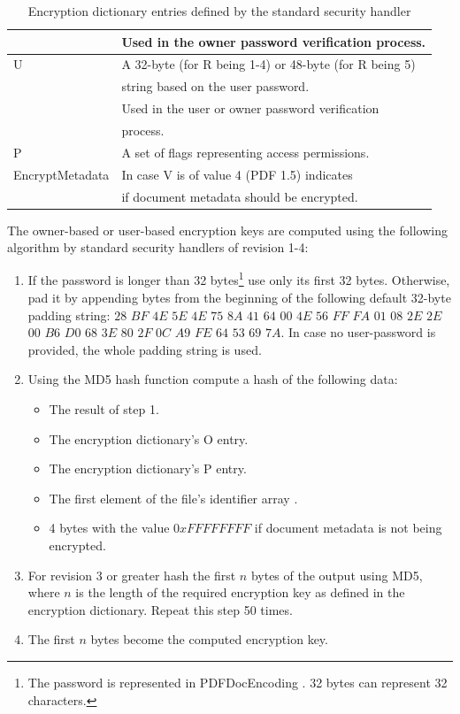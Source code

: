 \documentclass[11pt,oneside]{fithesis2}
\begin{document}
\begin{table}[hp]
\begin{tabular}{|l|l|}
		&Used in the owner password verification process.\\
	\hline
		U&A 32-byte (for R being 1-4) or 48-byte (for R being 5)\\ 
		&string based on the user password.\\
		&Used in the user or owner password verification \\ 
		&process.\\
	\hline
		P&A set of flags representing access permissions.\\
	\hline
		EncryptMetadata& In case V is of value 4 (PDF 1.5) indicates\\
		&if document metadata should be encrypted.\\
	\hline
           \end{tabular}
	\caption{Encryption dictionary entries defined by the standard security handler \cite{pdf_spec}}
	\label{handler_entries}
\end{table}

The owner-based or user-based encryption keys are computed using the following algorithm by standard security handlers of revision 1-4: 

\begin{enumerate}
\setlength\itemsep{0.1em}
\item{If the password is longer than 32 bytes\footnote{The password is represented in PDFDocEncoding \cite[157]{pdf_spec}. 32 bytes can represent 32 characters.} use only its first 32 bytes. Otherwise, pad it by appending bytes from the beginning of the following default 32-byte padding string: $28$ $BF$ $4E$ $5E$ $4E$ $75$ $8A$ $41$ $64$ $00$ $4E$ $56$ $FF$ $FA$ $01$ $08$ $2E$ $2E$ $00$ $B6$ $D0$ $68$ $3E$ $80$ $2F$ $0C$ $A9$ $FE$ $64$ $53$ $69$ $7A$. In case no user-password is provided, the whole padding string is used.}
\item{Using the MD5 hash function compute a hash of the following data:}
	\begin{itemize}
		\item{The result of step 1.}
		\item{The encryption dictionary's O entry.}
		\item{The encryption dictionary's P entry.}
		\item{The first element of the file's identifier array \cite[p. 43]{pdf_spec}.}
		\item{4 bytes with the value $0xFFFFFFFF$ if document metadata is not being encrypted.}
	\end{itemize}
\item{For revision 3 or greater hash the first $n$ bytes of the output using MD5, where $n$ is the length of the required encryption key as defined in the encryption dictionary. Repeat this step 50 times.}
\item{The first $n$ bytes become the computed encryption key.}
\end{enumerate}
\end{document}
